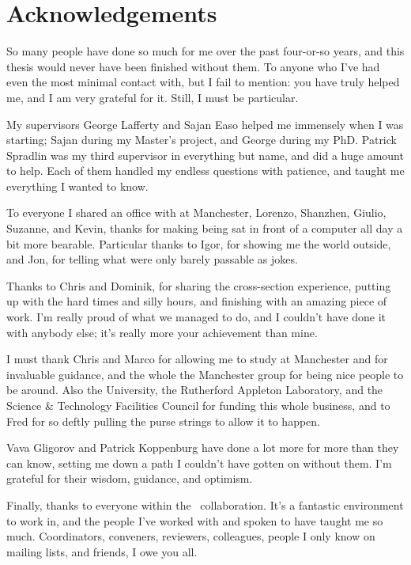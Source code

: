 \chapter{Acknowledgements}

So many people have done so much for me over the past four-or-so years, and 
this thesis would never have been finished without them.
To anyone who I've had even the most minimal contact with, but I fail to 
mention: you have truly helped me, and I am very grateful for it.
Still, I must be particular.

My supervisors George Lafferty and Sajan Easo helped me immensely when I was 
starting; Sajan during my Master's project, and George during my PhD.
Patrick Spradlin was my third supervisor in everything but name, and did a huge 
amount to help.
Each of them handled my endless questions with patience, and taught me 
everything I wanted to know.

To everyone I shared an office with at Manchester, Lorenzo, Shanzhen, Giulio, 
Suzanne, and Kevin, thanks for making being sat in front of a computer all day 
a bit more bearable.
Particular thanks to Igor, for showing me the world outside, and Jon, for 
telling what were only barely passable as jokes.

Thanks to Chris and Dominik, for sharing the cross-section experience, putting 
up with the hard times and silly hours, and finishing with an amazing piece of 
work.
I'm really proud of what we managed to do, and I couldn't have done it with 
anybody else; it's really more your achievement than mine.

I must thank Chris and Marco for allowing me to study at Manchester and for 
invaluable guidance, and the whole the Manchester group for being nice people 
to be around.
Also the University, the Rutherford Appleton Laboratory, and the Science \& 
Technology Facilities Council for funding this whole business, and to Fred for 
so deftly pulling the purse strings to allow it to happen.

Vava Gligorov and Patrick Koppenburg have done a lot more for more than they 
can know, setting me down a path I couldn't have gotten on without them.
I'm grateful for their wisdom, guidance, and optimism.

Finally, thanks to everyone within the \lhcb\ collaboration.
It's a fantastic environment to work in, and the people I've worked with and 
spoken to have taught me so much. Coordinators, conveners, reviewers, 
colleagues, people I only know on mailing lists, and friends, I owe you all.
